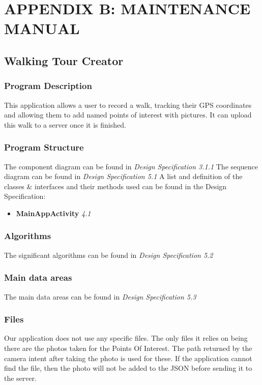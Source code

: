 \documentclass{project}
\begin{document}
\section{APPENDIX B: MAINTENANCE MANUAL}

\subsection{Walking Tour Creator}
\subsubsection{Program Description}
This application allows a user to record a walk, tracking their GPS coordinates and allowing them to add named points of interest with pictures. It can upload this walk to a server once it is finished.

\subsubsection{Program Structure}
The component diagram can be found in \textit{Design Specification 3.1.1}
The sequence diagram can be found in \textit{Design Specification 5.1}
A list and definition of the classes \& interfaces and their methods used can be found in the Design Specification:
\begin{itemize}
\item \textbf{MainAppActivity} \textit{4.1}
\end{itemize}

\subsubsection{Algorithms}
The significant algorithms can be found in \textit{Design Specification 5.2}

\subsubsection{Main data areas}
The main data areas can be found in \textit{Design Specification 5.3}

\subsubsection{Files}
Our application does not use any specific files. The only files it relies on being there are the photos taken for the Points Of Interest.
The path returned by the camera intent after taking the photo is used for these.
If the application cannot find the file, then the photo will not be added to the JSON before sending it to the server.
\end{document}
